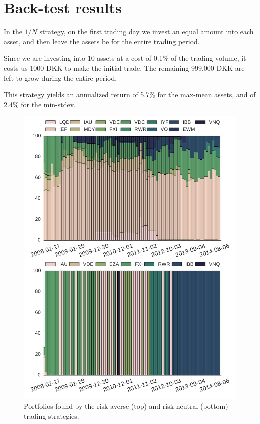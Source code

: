 \section{Back-test results}

In the $1/N$ strategy, on the first trading day we invest  an equal amount into each asset, and then leave the assets be for the entire trading period.

Since we are investing into 10 assets at a cost of 0.1\% of the trading volume, it costs us 1000 DKK to make the initial trade.
The remaining 999.000 DKK are left to grow during the entire period.

This strategy yields an annualized return of 5.7\% for the max-mean assets, and of 2.4\% for the min-stdev.


\begin{figure}[tp]
\centering
\includegraphics{../pic/trading_portfolio.pdf}
\caption{Portfolios found by the risk-averse (top) and risk-neutral (bottom) trading strategies.}
\label{fig:tradingportfolios}
\end{figure}


